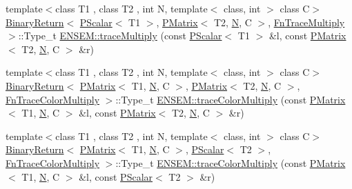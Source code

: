 \begin{DoxyCompactItemize}
\item 
{\footnotesize template$<$class T1 , class T2 , int N, template$<$ class, int $>$ class C$>$ }\\\mbox{\hyperlink{structENSEM_1_1BinaryReturn}{Binary\+Return}}$<$ \mbox{\hyperlink{classENSEM_1_1PScalar}{P\+Scalar}}$<$ T1 $>$, \mbox{\hyperlink{classENSEM_1_1PMatrix}{P\+Matrix}}$<$ T2, \mbox{\hyperlink{operator__name__util_8cc_a7722c8ecbb62d99aee7ce68b1752f337}{N}}, C $>$, \mbox{\hyperlink{structENSEM_1_1FnTraceMultiply}{Fn\+Trace\+Multiply}} $>$\+::Type\+\_\+t \mbox{\hyperlink{group__primmatrix_ga5b0cf4c87cad1bfd7dcad0a42d0b4ae6}{E\+N\+S\+E\+M\+::trace\+Multiply}} (const \mbox{\hyperlink{classENSEM_1_1PScalar}{P\+Scalar}}$<$ T1 $>$ \&l, const \mbox{\hyperlink{classENSEM_1_1PMatrix}{P\+Matrix}}$<$ T2, \mbox{\hyperlink{operator__name__util_8cc_a7722c8ecbb62d99aee7ce68b1752f337}{N}}, C $>$ \&r)
\item 
{\footnotesize template$<$class T1 , class T2 , int N, template$<$ class, int $>$ class C$>$ }\\\mbox{\hyperlink{structENSEM_1_1BinaryReturn}{Binary\+Return}}$<$ \mbox{\hyperlink{classENSEM_1_1PMatrix}{P\+Matrix}}$<$ T1, \mbox{\hyperlink{operator__name__util_8cc_a7722c8ecbb62d99aee7ce68b1752f337}{N}}, C $>$, \mbox{\hyperlink{classENSEM_1_1PMatrix}{P\+Matrix}}$<$ T2, \mbox{\hyperlink{operator__name__util_8cc_a7722c8ecbb62d99aee7ce68b1752f337}{N}}, C $>$, \mbox{\hyperlink{structENSEM_1_1FnTraceColorMultiply}{Fn\+Trace\+Color\+Multiply}} $>$\+::Type\+\_\+t \mbox{\hyperlink{group__primmatrix_ga017dba078c2a41f5ca2a8d2b934b20aa}{E\+N\+S\+E\+M\+::trace\+Color\+Multiply}} (const \mbox{\hyperlink{classENSEM_1_1PMatrix}{P\+Matrix}}$<$ T1, \mbox{\hyperlink{operator__name__util_8cc_a7722c8ecbb62d99aee7ce68b1752f337}{N}}, C $>$ \&l, const \mbox{\hyperlink{classENSEM_1_1PMatrix}{P\+Matrix}}$<$ T2, \mbox{\hyperlink{operator__name__util_8cc_a7722c8ecbb62d99aee7ce68b1752f337}{N}}, C $>$ \&r)
\item 
{\footnotesize template$<$class T1 , class T2 , int N, template$<$ class, int $>$ class C$>$ }\\\mbox{\hyperlink{structENSEM_1_1BinaryReturn}{Binary\+Return}}$<$ \mbox{\hyperlink{classENSEM_1_1PMatrix}{P\+Matrix}}$<$ T1, \mbox{\hyperlink{operator__name__util_8cc_a7722c8ecbb62d99aee7ce68b1752f337}{N}}, C $>$, \mbox{\hyperlink{classENSEM_1_1PScalar}{P\+Scalar}}$<$ T2 $>$, \mbox{\hyperlink{structENSEM_1_1FnTraceColorMultiply}{Fn\+Trace\+Color\+Multiply}} $>$\+::Type\+\_\+t \mbox{\hyperlink{group__primmatrix_ga34f5dfd94ab05f405e04e73c9e342aeb}{E\+N\+S\+E\+M\+::trace\+Color\+Multiply}} (const \mbox{\hyperlink{classENSEM_1_1PMatrix}{P\+Matrix}}$<$ T1, \mbox{\hyperlink{operator__name__util_8cc_a7722c8ecbb62d99aee7ce68b1752f337}{N}}, C $>$ \&l, const \mbox{\hyperlink{classENSEM_1_1PScalar}{P\+Scalar}}$<$ T2 $>$ \&r)

\end{DoxyCompactItemize}
